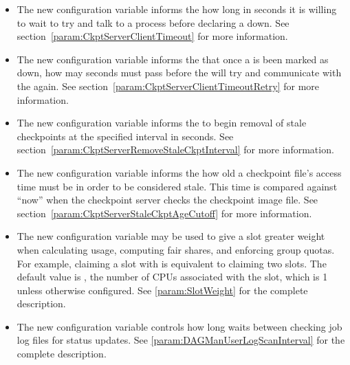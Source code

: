 \begin{itemize}

\item The new configuration variable 
informs the  how long in seconds it is willing to wait
to try and talk to a  process before declaring a
 down.
See section~\ref{param:CkptServerClientTimeout} for more information.

\item The new configuration variable
 informs the 
that once a  is been marked as down, how may seconds
must pass before the  will try and communicate with the
 again.
See section~\ref{param:CkptServerClientTimeoutRetry} for more information.

\item The new configuration variable
 informs the
 to begin removal of stale checkpoints at the specified
interval in seconds.
See section~\ref{param:CkptServerRemoveStaleCkptInterval} for more information.

\item The new configuration variable
 informs the
 how old a checkpoint file's access time must be
in order to be considered stale. This time is compared against ``now''
when the checkpoint server checks the checkpoint image file.
See section~\ref{param:CkptServerStaleCkptAgeCutoff} for more information.

\item The new configuration variable  may be used to
give a slot greater weight when calculating usage, computing fair
shares, and enforcing group quotas.  For example, claiming a slot with
 is equivalent to claiming two  slots.  The default value is , the number of CPUs
associated with the slot, which is 1 unless otherwise configured.
See \ref{param:SlotWeight} for the complete description.


\item The new configuration variable 
controls how long  waits between checking job log files
for status updates.
See \ref{param:DAGManUserLogScanInterval} for the complete description.


\end{itemize}

